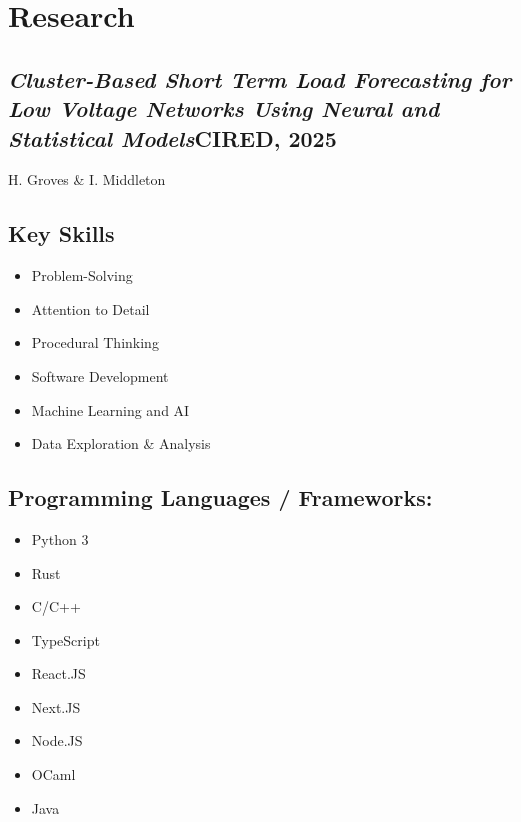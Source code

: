 \documentclass[9pt]{extarticle}
\begin{document}
\begin{minipage}{0.65\textwidth}
	\section{Research}

	\subsection{\textit{Cluster-Based Short Term Load Forecasting for Low Voltage Networks Using Neural and Statistical Models}\hfill CIRED, 2025}
	H. Groves \& I. Middleton

\end{minipage}
\hspace{0.5cm}
\begin{minipage}{0.3\textwidth}
	\raggedright
	\begin{tcolorbox}[colback=grey]

		\section{Key Skills}

		\begin{itemize}[leftmargin=*]
			\item Problem-Solving
			\item Attention to Detail
			\item Procedural Thinking
			\item Software Development
			\item Machine Learning and AI
			\item Data Exploration \& Analysis

		\end{itemize}

		\subsection{Programming Languages / Frameworks:}
		\begin{itemize}[leftmargin=*]

			\item Python 3
			\item Rust
			\item C/C++
			\item TypeScript
			\item React.JS
			\item Next.JS
			\item Node.JS
			\item OCaml
			\item Java



\end{itemize}
\end{tcolorbox}
\end{minipage}
\end{document}
